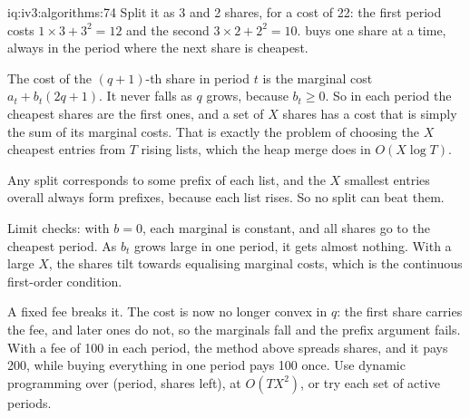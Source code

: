 \begin{solution}{iq:iv3:algorithms:74}
Split it as 3 and 2 shares, for a cost of 22: the first period costs $1 \times 3 + 3^2 = 12$ and the second $3 \times 2 + 2^2 = 10$.  buys one share at a time, always in the period where the next share is cheapest.
\label{lst:iv3:al:slicing}

The cost of the $(q + 1)$-th share in period $t$ is the marginal cost $a_t + b_t(2q + 1)$. It never falls as $q$ grows, because $b_t \ge 0$. So in each period the cheapest shares are the first ones, and a set of $X$ shares has a cost that is simply the sum of its marginal costs. That is exactly the problem of choosing the $X$ cheapest entries from $T$ rising lists, which the heap merge does in $O(X \log T)$.

Any split corresponds to some prefix of each list, and the $X$ smallest entries overall always form prefixes, because each list rises. So no split can beat them.

Limit checks: with $b = 0$, each marginal is constant, and all shares go to the cheapest period. As $b_t$ grows large in one period, it gets almost nothing. With a large $X$, the shares tilt towards equalising marginal costs, which is the continuous first-order condition.

A fixed fee breaks it. The cost is now no longer convex in $q$: the first share carries the fee, and later ones do not, so the marginals fall and the prefix argument fails. With a fee of 100 in each period, the method above spreads shares, and it pays 200, while buying everything in one period pays 100 once. Use dynamic programming over (period, shares left), at $O(TX^2)$, or try each set of active periods.

\end{solution}

